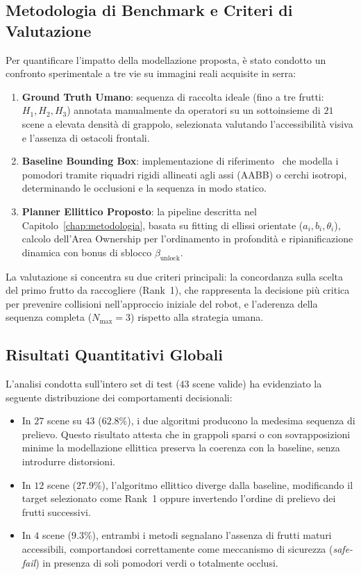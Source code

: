 \subsection{Metodologia di Benchmark e Criteri di Valutazione}
\label{subsec:metodologia_benchmark}

Per quantificare l'impatto della modellazione proposta, è stato condotto un 
confronto sperimentale a tre vie su immagini reali acquisite in serra:
\begin{enumerate}
    \item \textbf{Ground Truth Umano}: sequenza di raccolta ideale (fino a 
    tre frutti: $H_1, H_2, H_3$) annotata manualmente da operatori su un 
    sottoinsieme di $21$ scene a elevata densità di grappolo, selezionata 
    valutando l'accessibilità visiva e l'assenza di ostacoli frontali.
    \item \textbf{Baseline Bounding Box}: implementazione di 
    riferimento~\cite{collega_yolo} che modella i pomodori tramite riquadri 
    rigidi allineati agli assi (AABB) o cerchi isotropi, determinando le 
    occlusioni e la sequenza in modo statico.
    \item \textbf{Planner Ellittico Proposto}: la pipeline descritta nel 
    Capitolo~\ref{chap:metodologia}, basata su fitting di ellissi orientate 
    ($a_i, b_i, \theta_i$), calcolo dell'Area Ownership per l'ordinamento in 
    profondità e ripianificazione dinamica con bonus di sblocco 
    $\beta_{\text{unlock}}$.
\end{enumerate}

La valutazione si concentra su due criteri principali: la concordanza sulla 
scelta del primo frutto da raccogliere (Rank~1), che rappresenta la decisione 
più critica per prevenire collisioni nell'approccio iniziale del robot, e 
l'aderenza della sequenza completa ($N_{\max} = 3$) rispetto alla strategia 
umana.


\subsection{Risultati Quantitativi Globali}
\label{subsec:risultati_globali}

L'analisi condotta sull'intero set di test ($43$ scene valide) ha evidenziato 
la seguente distribuzione dei comportamenti decisionali:
\begin{itemize}
    \item In $27$ scene su $43$ ($62.8\%$), i due algoritmi producono la 
    medesima sequenza di prelievo. Questo risultato attesta che in grappoli 
    sparsi o con sovrapposizioni minime la modellazione ellittica preserva la 
    coerenza con la baseline, senza introdurre distorsioni.
    \item In $12$ scene ($27.9\%$), l'algoritmo ellittico diverge dalla 
    baseline, modificando il target selezionato come Rank~1 oppure invertendo 
    l'ordine di prelievo dei frutti successivi.
    \item In $4$ scene ($9.3\%$), entrambi i metodi segnalano l'assenza di 
    frutti maturi accessibili, comportandosi correttamente come meccanismo di 
    sicurezza (\textit{safe-fail}) in presenza di soli pomodori verdi o 
    totalmente occlusi.
\end{itemize}

